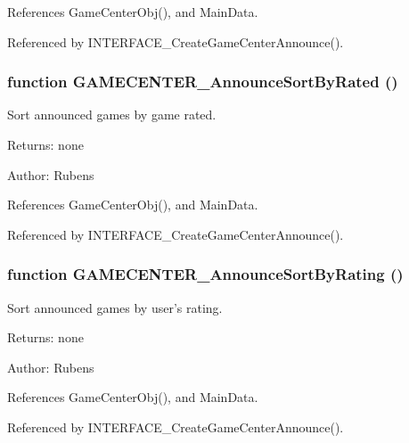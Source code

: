 References GameCenterObj(), and MainData.

Referenced by INTERFACE\_\-CreateGameCenterAnnounce().
\subsubsection[GAMECENTER\_\-AnnounceSortByRated]{\setlength{\rightskip}{0pt plus 5cm}function GAMECENTER\_\-AnnounceSortByRated ()}\label{gamecenter_2gamecenter_8js_c9212fafb2dbf3b60ea8c143af8e6fd7}


Sort announced games by game rated. 

\begin{Desc}
\item[Returns:]none \end{Desc}
\begin{Desc}
\item[Author:]Rubens \end{Desc}


References GameCenterObj(), and MainData.

Referenced by INTERFACE\_\-CreateGameCenterAnnounce().
\subsubsection[GAMECENTER\_\-AnnounceSortByRating]{\setlength{\rightskip}{0pt plus 5cm}function GAMECENTER\_\-AnnounceSortByRating ()}\label{gamecenter_2gamecenter_8js_304babbcade2f47d2c25cfd7e181611a}


Sort announced games by user's rating. 

\begin{Desc}
\item[Returns:]none \end{Desc}
\begin{Desc}
\item[Author:]Rubens \end{Desc}


References GameCenterObj(), and MainData.

Referenced by INTERFACE\_\-CreateGameCenterAnnounce().
